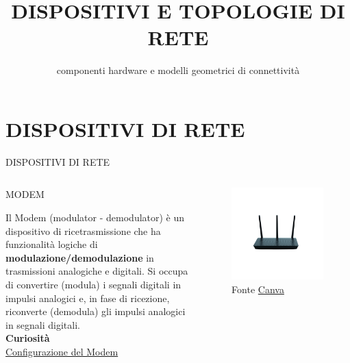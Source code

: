 \documentclass[aspectratio=1610]{beamer}
\title{DISPOSITIVI E TOPOLOGIE DI RETE}
\subtitle{componenti hardware e modelli geometrici di connettività}
\date{}
\institute{\textit{
        Fonti:
        \begin{itemize}
            \item[-] \href{https://it.wikipedia.org/wiki/Rete_di_computer}{Wikipedia}
            \item[-] \href{https://www.fastweb.it/fastweb-plus/digital-magazine/}{Fastweb Plus}
        \end{itemize}
    }
}
\begin{document}
\begin{frame}
    \titlepage
\end{frame}

\section{DISPOSITIVI DI RETE}

\begin{frame}{DISPOSITIVI DI RETE}
    \begin{columns}
            \justifying
            \begin{alertblock}{MODEM}
                \begin{minipage}{0.96\linewidth}
                    \justifying
                    Il Modem (modulator - demodulator) è un dispositivo di ricetrasmissione che ha 
                    funzionalità logiche di \textbf{modulazione/demodulazione} in trasmissioni analogiche e digitali. 
                    Si occupa di convertire (modula) i segnali digitali in impulsi analogici e, in fase di ricezione, 
                    riconverte (demodula) gli impulsi analogici in segnali digitali.\\
                    \bigskip
                    \tiny{\textbf{Curiosità}}\\
                    \tiny{\href{https://www.fastweb.it/fastweb-plus/digital-magazine/i-consigli-per-configurare-un-modem-router-wifi/}{Configurazione del Modem}}
                \end{minipage}
            \end{alertblock}
            \begin{figure}
                \includegraphics[width=\linewidth]{img/modemrouter.png}
                \caption{{Fonte \href{https://www.canva.com/}{Canva}}}
            \end{figure}
    \end{columns}
\end{frame}
\end{document}
